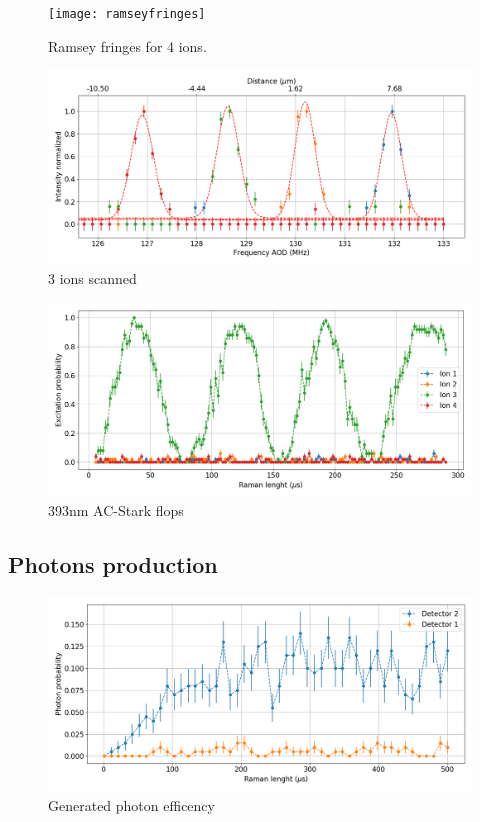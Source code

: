 \begin{figure}[H]
\centering
\texttt{[image: ramseyfringes]}
\caption{Ramsey fringes for 4 ions.}
\label{ramseyfringes}
\end{figure}
\begin{figure}[H]
\centering
\includegraphics[width=\textwidth]{img/AODscan}
\caption{3 ions scanned}
\end{figure}
\begin{figure}[H]
\centering
\includegraphics[width=\textwidth]{img/ACscan}
\caption{393nm AC-Stark flops}
\label{ACscan}
\end{figure}

\subsection{Photons production}
\begin{figure}[H]
\centering
\includegraphics[width=\textwidth]{img/photonefficency_witherror}
\caption{Generated photon efficency}
\end{figure}

